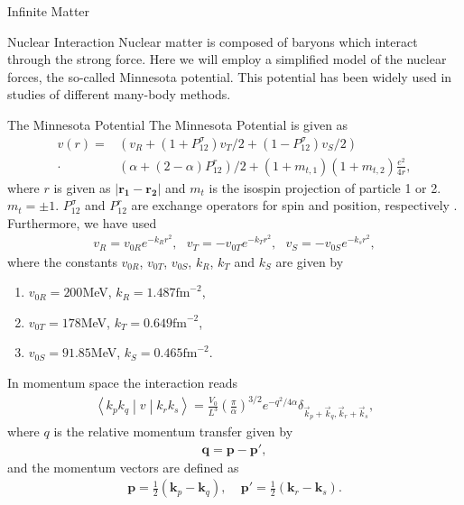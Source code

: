 \documentclass[twoside,english]{uiofysmaster}
\begin{document}
\begin{chapter}{Infinite Matter}
	\begin{section}{Nuclear Interaction}
		Nuclear matter is composed of baryons which interact through the strong force. Here we will employ a simplified model of the nuclear forces, the so-called Minnesota potential. This potential has been widely used in studies of different many-body methods.
		
		\begin{subsection}{The Minnesota Potential}
			The Minnesota Potential is given as
			\begin{align}
				v(r) = &\left(v_R + (1 + P_{12}^\sigma) v_T/2 + (1 - P_{12}^\sigma) v_S/2 \right) \\
					   \cdot &\left( \alpha + (2- \alpha)P_{12}^r \right)/2 + (1+m_{t,1})(1+m_{t,2})\frac{e^2}{4r}, \nonumber
			\end{align}
			where $r$ is given as $\left| \mathbf{r_1} - \mathbf{r_2} \right|$ and $m_t$ is the isospin projection of particle 1 or 2. $m_t = \pm 1$. 
			$P_{12}^\sigma $ and $P_{12}^r$ are exchange operators for spin and position, respectively \cite{Baardsen}. Furthermore, we have used
			\begin{align} 
				v_R = v_{0R}e^{-k_R r^2}, \:\:\: v_T = -v_{0T} e^{-k_Tr^2}, \:\:\: v_S = -v_{0S}e^{-k_sr^2},
			\end{align}
			where the constants $v_{0R}$, $v_{0T}$, $v_{0S}$, $k_R$, $k_T$ and $k_S$ are given by \cite{Thompson1977}
			\begin{enumerate}
				\item $v_{0R} = 200$MeV,  $k_R = 1.487 \text{fm}^{-2}$,
				\item $v_{0T} = 178$MeV,  $k_T = 0.649 \text{fm}^{-2}$,
				\item $v_{0S} = 91.85$MeV, $k_S = 0.465 \text{fm}^{-2}$.
			\end{enumerate}
In momentum space the interaction reads
			\begin{align}
			 	\left<k_p k_q \middle| v \middle| k_r k_s \right> = \frac{V_0}{L^3} \left(\frac{\pi}{\alpha}\right)^{3/2} e^{-q^2 / 4 \alpha} \delta_{\vec k_p + \vec k_q, \vec k_r + \vec k_s},
			\end{align}
			where $q$ is the relative momentum transfer given by 
			\begin{align}
				\mathbf{q} = \mathbf{p} - \mathbf{p'},
			\end{align}
			and the momentum vectors are defined as
			\begin{align}
				\mathbf{p} = \frac{1}{2} (\mathbf{k}_p - \mathbf{k}_q), \:\:\:\:\: \mathbf{p'} = \frac{1}{2}(\mathbf{k}_r- \mathbf{k}_s).

\end{align}
\end{subsection}
\end{section}
\end{chapter}
\end{document}
